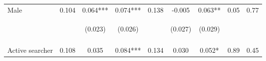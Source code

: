 \begin{table}[h!]
{\begin{tabular}{lcccccccc}
\noalign{\smallskip}Male & 0.104 & 0.064*** & 0.074*** & 0.138 & -0.005 & 0.063** & 0.05 & 0.77\\
 & \begin{footnotesize}\end{footnotesize} & \begin{footnotesize}(0.023)\end{footnotesize} & \begin{footnotesize}(0.026)\end{footnotesize} & \begin{footnotesize}\end{footnotesize} & \begin{footnotesize}(0.027)\end{footnotesize} & \begin{footnotesize}(0.029)\end{footnotesize} & \begin{footnotesize}\end{footnotesize} & \begin{footnotesize}\end{footnotesize}\\
 & \begin{footnotesize}\end{footnotesize} & \begin{footnotesize}[0.027]\end{footnotesize} & \begin{footnotesize}[0.004]\end{footnotesize} & \begin{footnotesize}\end{footnotesize} & \begin{footnotesize}[1.000]\end{footnotesize} & \begin{footnotesize}[0.068]\end{footnotesize} & \begin{footnotesize}\end{footnotesize} & \begin{footnotesize}\end{footnotesize}\\
\noalign{\smallskip}Active searcher & 0.108 & 0.035 & 0.084*** & 0.134 & 0.030 & 0.052* & 0.89 & 0.45\\

\end{tabular}}
\end{table}

